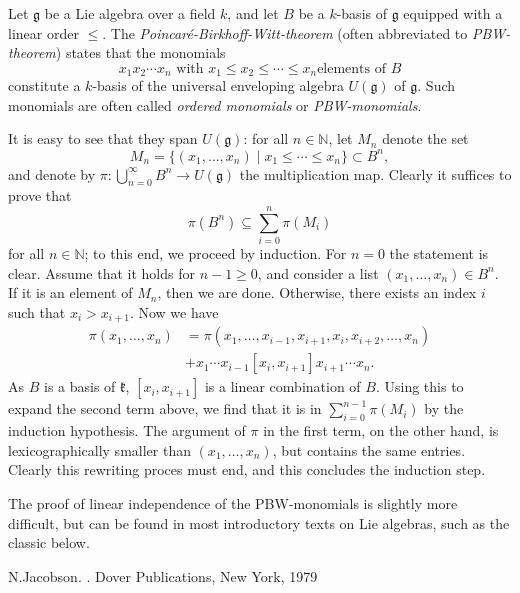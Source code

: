 \documentclass[12pt]{article}
\newcommand{\NN}{\mathbb{N}}
\begin{document}
Let $\mathfrak{g}$ be a Lie algebra over a field $k$, and let
$B$ be a $k$-basis of $\mathfrak{g}$ equipped with a linear
order $\leq$. The {\em Poincar\'e-Birkhoff-Witt-theorem} (often
abbreviated to {\em PBW-theorem}) states that the monomials
\[ x_1 x_2 \cdots x_n \text{ with } x_1 \leq x_2 \leq \cdots \leq x_n \text{
elements of } B \]
constitute a $k$-basis of the universal enveloping algebra
$U(\mathfrak{g})$ of $\mathfrak{g}$. Such monomials are often called
{\em ordered monomials}  or {\em PBW-monomials}.

It is easy to see that they span $U(\mathfrak{g})$: for all $n \in
\NN$, let $M_n$ denote the set
\[ M_n=\{(x_1,\ldots,x_n)\mid x_1 \leq \cdots \leq x_n\} \subset B^n, \]
and denote by $\pi:\bigcup_{n=0}^\infty B^n \rightarrow U(\mathfrak{g})$ the
multiplication map. Clearly it suffices to prove that
\[ \pi(B^n) \subseteq \sum_{i=0}^n \pi(M_i) \]
for all $n \in \NN$; to this end, we proceed by induction.  For $n=0$
the statement is clear. Assume that it holds for $n-1\geq 0$, and consider a
list $(x_1,\ldots,x_n) \in B^n$. If it is an element of $M_n$, then we are
done. Otherwise, there exists an index $i$ such that $x_i>x_{i+1}$.
Now we have
\begin{align*}
\pi(x_1,\ldots,x_n)&=\pi(x_1,\ldots,x_{i-1},x_{i+1},x_i,x_{i+2},\ldots,x_n)\\
&+x_1\cdots x_{i-1}[x_i,x_{i+1}]x_{i+1}\cdots x_n.
\end{align*}
As $B$ is a basis of $\mathfrak{k}$, $[x_i,x_{i+1}]$ is a linear
combination of $B$. Using this to expand the second term above, we find
that it is in $\sum_{i=0}^{n-1} \pi(M_i)$ by the induction hypothesis.
The argument of $\pi$ in the first term, on the other hand, is
lexicographically smaller than $(x_1,\ldots,x_n)$, but contains the
same entries. Clearly this rewriting proces must end, and this
concludes the induction step.

The proof of linear independence of the PBW-monomials is slightly more
difficult, but can be found in most introductory texts on Lie algebras, such as the classic below.

\begin{thebibliography}{9}
N.\@ Jacobson. \emph{}. Dover Publications, New York, 1979
\end{thebibliography}
\end{document}
